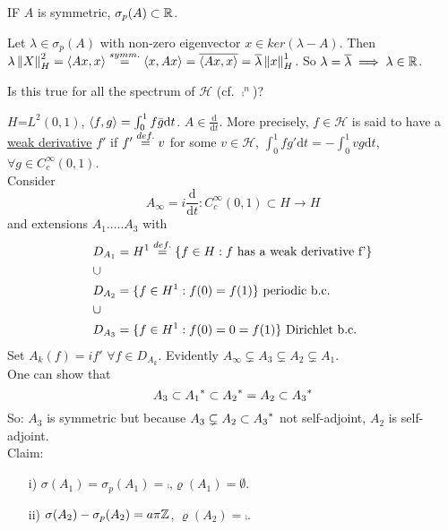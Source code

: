 \begin{lemma}
	IF $A$ is symmetric, $\sigma_p(A)\subset\mathbb{R}$.
	\begin{pf}{}{}
		Let $\lambda\in\sigma_p(A)$ with non-zero eigenvector $x\in ker(\lambda-A)$. Then $\lambda\left\|{X}\right\|_H^2=\left<{Ax},{x}\right>\stackrel{symm.}{=}\left<{x},{Ax}\right>=\overline{\left<{Ax},{x}\right>}=\overline{\lambda}\left\|{x}\right\|_H^1$. So $\lambda=\overline{\lambda}\implies \lambda\in\mathbb{R}$.
	\end{pf}
\end{lemma}
Is this true for all the spectrum of $\mathcal{H}$ (cf. $\comp^n$)?
\begin{example}\nl
	$H$=$L^2(0,1)$, $\left<{f},{g}\right>=\int_0^1f\bar{g} \mathrm{d}t$. $A\in\frac{\mathrm{d}}{\mathrm{d}t}$. More precisely, $f\in\mathcal{H}$ is said to have a \underline{weak derivative} $f'$ if $f'\stackrel{def.}{=}{v}$ for some $v\in \mathcal{H}$, $\int_0^1 fg'\mathrm{d}t=-\int_0^1 vg\mathrm{d}t$, $\forall g\in C^\infty_c(0,1)$.\\
	Consider
	$$
		A_\infty =i\frac{\mathrm{d}}{\mathrm{d}t}:C^\infty_c(0,1)\subset H\to H
	$$
	and extensions $A_1$.....$A_3$ with
	\begin{equation}
		\begin{aligned}
			 & D_{A_1}=H^1\stackrel{def.}{=}\{f\in H: f \text{ has a weak derivative  f'}\} \\
			 & \cup                                                            \\
			 & D_{A_2}=\{f\in H^1:f(0)=f(1)\}\text{ periodic b.c.}             \\
			 & \cup                                                            \\
			 & D_{A_3}=\{f\in H^1: f(0)=0=f(1)\}\text{ Dirichlet b.c.}         \\
		\end{aligned}
	\end{equation}
	Set $A_k(f)=if'\,\,\forall f\in D_{A_k}$. Evidently $ A_\infty\subsetneq A_3\subsetneq A_2 \subsetneq A_1$.\\
	One can show that
	$$
		A_3\subset{A_1}^*\subset{A_2}^*=A_2\subset{A_3}^*
	$$
	So: $A_3$ is symmetric but because $A_3\subsetneq A_2\subset {A_3}^*$ not self-adjoint, $A_2$ is self-adjoint.\\
	Claim:
	\begin{itemize}
		\item [i)] $\sigma(A_1)=\sigma_p(A_1)=\comp$,$ \varrho(A_1)=\emptyset$.
		\item [ii)] $\sigma(A_2)-\sigma_p(A_2)=a\pi\mathbb{Z}$, $\varrho(A_2)=\comp$.

\end{itemize}
\end{example}
